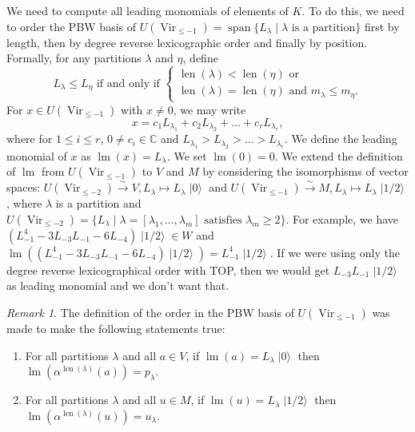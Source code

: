 \documentclass[a4paper, 12pt, reqno]{amsart}
\theoremstyle{remark}
\newtheorem{remark}[theorem]{Remark}
\numberwithin{equation}{subsection}
\DeclareMathOperator{\Vir}{Vir}
\DeclareMathOperator{\lm}{lm}
\DeclareMathOperator{\vspan}{span}
\DeclareMathOperator{\len}{len}
\DeclareMathOperator{\vac}{|0\rangle}
\DeclareMathOperator{\vachalf}{|1/2\rangle}
\begin{document}
We need to compute all leading monomials of elements of $K$.
To do this, we need to order the PBW basis of $U(\Vir_{\le -1}) = \vspan\{L_\lambda \mid \lambda\text{ is a partition}\}$ first by length, then by degree reverse lexicographic order and finally by position.
Formally, for any partitions $\lambda$ and $\eta$, define
\begin{equation*}
  L_\lambda \le L_\eta\text{ if and only if }
  \begin{cases}
    \len(\lambda) < \len(\eta)\text{ or } \\
    \len(\lambda) = \len(\eta)\text{ and }m_\lambda \le m_\eta.
  \end{cases}
\end{equation*}
For $x \in U(\Vir_{\le -1})$ with $x \neq 0$, we may write
\begin{equation*}
  x = c_1L_{\lambda_1} + c_2L_{\lambda_2} + \dots + c_rL_{\lambda_r},
\end{equation*}
where for $1 \le i\le r$, $0 \neq c_i \in \mathbb{C}$ and $L_{\lambda_1} > L_{\lambda_2} > \dots > L_{\lambda_r}$.
We define the leading monomial of $x$ as $\lm(x) = L_\lambda$. 
We set $\lm(0) = 0$.
We extend the definition of $\lm$ from $U(\Vir_{\le -1})$ to $V$ and $M$ by considering the isomorphisms of vector spaces: $U(\Vir_{\le -2}) \xrightarrow{\sim} V, L_\lambda \mapsto L_\lambda\vac$ and $U(\Vir_{\le -1}) \xrightarrow{\sim} M, L_\lambda \mapsto L_\lambda\vachalf$, where $\lambda$ is a partition and $U(\Vir_{\le -2}) = \{L_\lambda \mid \lambda = [\lambda_1, \dots, \lambda_m]\text{ satisfies }\lambda_m \ge 2\}$.
For example, we have $(L_{-1}^4 - 3L_{-3}L_{-1} - 6L_{-4})\vachalf \in W$ and $\lm((L_{-1}^4 - 3L_{-3}L_{-1} - 6L_{-4})\vachalf) = L_{-1}^4\vachalf$.
If we were using only the degree reverse lexicographical order with TOP, then we would get $L_{-3}L_{-1}\vachalf$ as leading monomial and we don't want that.

\begin{remark}
  \label{rmk:36}
  The definition of the order in the PBW basis of $U(\Vir_{\le -1})$ was made to make the following statements true:
  \begin{enumerate}
  \item For all partitions $\lambda$ and all $a \in V$, if $\lm(a) = L_\lambda\vac$ then $\lm(\alpha^{\len(\lambda)}(a)) = p_\lambda$.
  \item For all partitions $\lambda$ and all $u \in M$, if $\lm(u) = L_\lambda\vachalf$ then $\lm(\alpha^{\len(\lambda)}(u)) = u_\lambda$.
  \end{enumerate}
\end{remark}
\end{document}
